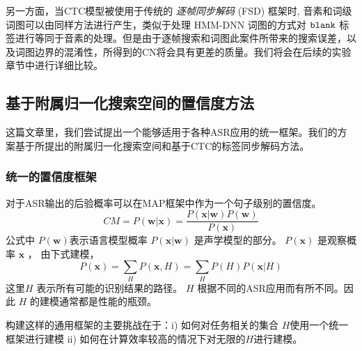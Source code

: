另一方面，当CTC模型被使用于传统的 {\em 逐帧同步解码} (FSD) 框架时, 音素和词级词图可以由同样方法进行产生\cite{povey2012generating}，类似于处理 HMM-DNN 词图的方式对 $\tt blank$ 标签进行等同于音素的处理。但是由于逐帧搜索和词图此案件所带来的搜索误差，以及词图边界的混淆性，所得到的CN将会具有更差的质量。我们将会在后续的实验章节中进行详细比较。

%


  \subsection{基于附属归一化搜索空间的置信度方法}
  \label{Sec:norm-gragh}

这篇文章里，我们尝试提出一个能够适用于各种ASR应用的统一框架。我们的方案基于所提出的附属归一化搜索空间和基于CTC的标签同步解码方法。

  \subsubsection{统一的置信度框架}
  对于ASR输出的后验概率可以在MAP框架中作为一个句子级别的置信度。
  \begin{equation}\label{eq:cm-post}
        CM=P(\mathbf{w}|\mathbf{x}) =
         \frac{P(\mathbf{x}|\mathbf{w}) P(\mathbf{w})}{P(\mathbf{x})}
  \end{equation}
 公式中 $P(\mathbf{w})$表示语言模型概率 $P(\mathbf{x}|\mathbf{w})$  是声学模型的部分。 $P(\mathbf{x})$ 是观察概率 $\mathbf{x}$ ， 由下式建模，
   \begin{equation}\label{eq:cm-obser}
        P(\mathbf{x})=\sum_H P(\mathbf{x},H)= \sum_H P(H)   P(\mathbf{x}|H)
  \end{equation}
 这里$H$ 表示所有可能的识别结果的路径。 $H$ 根据不同的ASR应用而有所不同。因此 $H$ 的建模通常都是性能的瓶颈。

构建这样的通用框架的主要挑战在于：i) 如何对任务相关的集合 $H$使用一个统一框架进行建模 ii) 如何在计算效率较高的情况下对无限的$H$进行建模。


